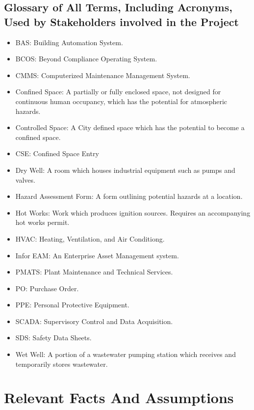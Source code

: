 \documentclass[12pt]{article}
\begin{document}
\subsection{Glossary of All Terms, Including Acronyms, Used by Stakeholders
involved in the Project}
\begin{itemize}
    \item BAS: Building Automation System.
    \item BCOS: Beyond Compliance Operating System.
    \item CMMS: Computerized Maintenance Management System.
    \item Confined Space: A partially or fully enclosed space, not designed for 
    continuous human occupancy, which has the potential for 
    atmospheric hazards.
    \item Controlled Space: A City defined space which has the potential to
    become a confined space.
    \item CSE: Confined Space Entry
    \item Dry Well: A room which houses industrial equipment such as pumps 
    and valves.
    \item Hazard Assessment Form: A form outlining potential
    hazards at a location.
    \item Hot Works: Work which produces ignition sources.
    Requires an accompanying hot works permit.
    \item HVAC: Heating, Ventilation, and Air Conditiong.
    \item Infor EAM: An Enterprise Asset Management system.
    \item PMATS: Plant Maintenance and Technical Services.
    \item PO: Purchase Order.
    \item PPE: Personal Protective Equipment.
    \item SCADA: Supervisory Control and Data Acquisition.
    \item SDS: Safety Data Sheets.
    \item Wet Well: A portion of a wastewater pumping station which receives
    and temporarily stores wastewater.
\end{itemize}

\section{Relevant Facts And Assumptions}
\end{document}
